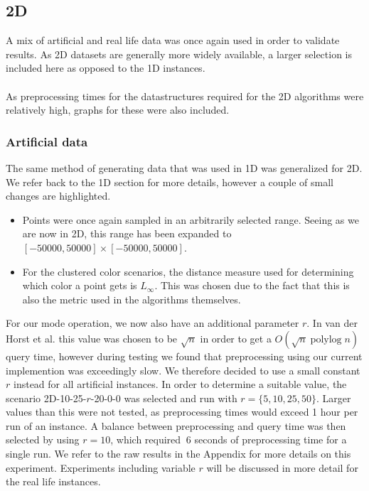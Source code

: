 \documentclass{article}
\newcommand{\fb}[1]{{#1}}
\newcommand{\fbnote}[1]{{}}
\DeclareMathOperator{\polylog}{polylog}
\begin{document}
\subsection{2D}
A mix of artificial and real life data was once again used in order to validate
results. As 2D datasets are generally more widely available, a larger selection
is included here as opposed to the 1D instances. \\\\ As preprocessing times
for the datastructures required for the 2D algorithms were relatively high,
graphs for these were also included. \subsubsection*{Artificial data} The same
method of generating data that was used in 1D was generalized for 2D. We refer
back to the 1D section for more details, however a couple of small changes are
highlighted.
\begin{itemize}
    \item Points were once again sampled in an arbitrarily selected range. Seeing as we
          are now in 2D, this range has been expanded to $[-50000, 50000] \times [-50000,
                  50000]$. \fbnote{As a response to Erwin's question as to why 5e4 was chosen: very much arbitrary, it was the first thing that came to mind that felt like a "nice" range + I was initially testing with integers during the 1D tree splitting fase so a range larger than [-1, 1] was required.}
    \item For the clustered color scenarios, the distance measure used for determining
          which color a point gets is $L_\infty$. This was chosen due to the fact that
          this is also the metric used in the algorithms themselves.
\end{itemize}
\fbnote{Response to feedback from Erwin: I decided to keep this section here instead of moving it due to the fact that I feel that this discussion of which $r$ is used is only interesting for these specific instances, however I do understand the critique.}
\fb{For our mode operation, we now also have an additional parameter $r$. In van der Horst et al. this value was chosen to be $\sqrt{n}$ in order to get a $O(\sqrt{n} \polylog n)$ query time, however during testing we found that preprocessing using our current implemention was exceedingly slow. We therefore decided to use a small constant $r$ instead for all artificial instances. In order to determine a suitable value, the scenario 2D-10-25-$r$-20-0-0 was selected and run with $r=\{ 5, 10, 25, 50 \}$. Larger values than this were not tested, as preprocessing times would exceed 1 hour per run of an instance. A balance between preprocessing and query time was then selected by using $r=10$, which required $~6$ seconds of preprocessing time for a single run. We refer to the raw results in the Appendix for more details on this experiment. Experiments including variable $r$ will be discussed in more detail for the real life instances.} \\\\
\end{document}
